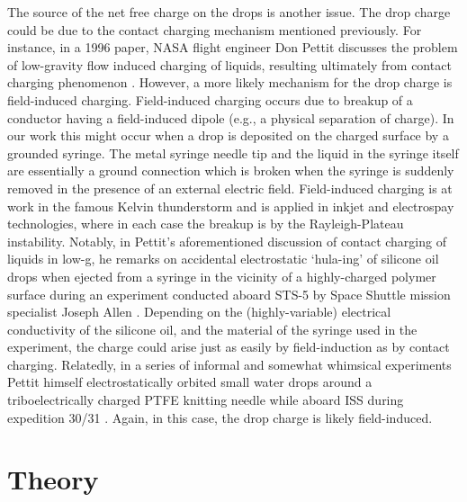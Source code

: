 \documentclass[aip,reprint, floatfix]{revtex4-1}
\begin{document}
The source of the net free charge on the drops is another issue. The drop charge could be due to the contact charging mechanism mentioned previously. For instance, in a 1996 paper, NASA flight engineer Don Pettit discusses the problem of low-gravity flow induced charging of liquids, resulting ultimately from contact charging phenomenon \cite{pettit_donald_flow_????}. However, a more likely mechanism for the drop charge is field-induced charging. Field-induced charging occurs due to breakup of a conductor having a field-induced dipole (e.g., a physical separation of charge). In our work this might occur when a drop is deposited on the charged surface by a grounded syringe. The metal syringe needle tip and the liquid in the syringe itself are essentially a ground connection which is broken when the syringe is suddenly removed in the presence of an external electric field. Field-induced charging is at work in the famous Kelvin thunderstorm and is applied in inkjet and electrospay technologies, where in each case the breakup is by the Rayleigh-Plateau instability. Notably, in Pettit's aforementioned discussion of contact charging of liquids in low-g, he remarks on accidental electrostatic `hula-ing' of silicone oil drops when ejected from a syringe in the vicinity of a highly-charged polymer surface during an experiment conducted aboard STS-5 by Space Shuttle mission specialist Joseph Allen \cite{pettit_donald_flow_????}. Depending on the (highly-variable) electrical conductivity of the silicone oil, and the material of the syringe used in the experiment, the charge could arise just as easily by field-induction as by contact charging. Relatedly, in a series of informal and somewhat whimsical experiments Pettit himself electrostatically orbited small water drops around a triboelectrically charged PTFE knitting needle while aboard ISS during expedition 30/31 \cite{stevenson_electrostatic_2015}. Again, in this case, the drop charge is likely field-induced.

\section{Theory}
\end{document}
